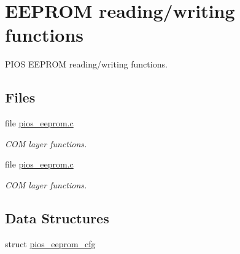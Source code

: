 \hypertarget{group___p_i_o_s___e_e_p_r_o_m}{\section{E\-E\-P\-R\-O\-M reading/writing functions}
\label{group___p_i_o_s___e_e_p_r_o_m}
}


P\-I\-O\-S E\-E\-P\-R\-O\-M reading/writing functions.  


\subsection*{Files}
\begin{DoxyCompactItemize}
\item 
file \hyperlink{pios__eeprom_8c}{pios\-\_\-eeprom.\-c}
\begin{DoxyCompactList}\small\item\em C\-O\-M layer functions. \end{DoxyCompactList}\item 
file \hyperlink{pios__eeprom_8c}{pios\-\_\-eeprom.\-c}
\begin{DoxyCompactList}\small\item\em C\-O\-M layer functions. \end{DoxyCompactList}\end{DoxyCompactItemize}
\subsection*{Data Structures}
\begin{DoxyCompactItemize}
\item 
struct \hyperlink{structpios__eeprom__cfg}{pios\-\_\-eeprom\-\_\-cfg}
\end{DoxyCompactItemize}

